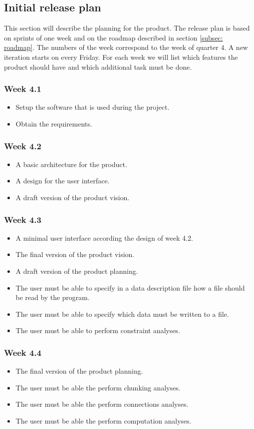 \subsection{Initial release plan}
\label{subsec: release-plan}
This section will describe the planning for the product. The release plan is based on sprints of one week and on the roadmap described in section \ref{subsec: roadmap}. The numbers of the week correspond to the week of quarter 4. A new iteration starts on every Friday. For each week we will list which features the product should have and which additional task must be done.
\subsubsection{Week 4.1}
\begin{itemize}
	\item Setup the software that is used during the project.
	\item Obtain the requirements.
\end{itemize}

\subsubsection{Week 4.2}
\begin{itemize}
\item A basic architecture for the product.
\item A design for the user interface.
\item A draft version of the product vision.
\end{itemize}
\subsubsection{Week 4.3}
\begin{itemize}
	\item A minimal user interface according the design of week 4.2.
	\item The final version of the product vision.
	\item A draft version of the product planning.
	\item The user must be able to specify in a data description file how a file should be read by the program.
	\item The user must be able to specify which data must be written to a file.
	\item The user must be able to perform constraint analyses.
\end{itemize}
\subsubsection{Week 4.4}
\begin{itemize}
	\item The final version of the product planning.
	\item The user must be able the perform chunking analyses.
	\item The user must be able the perform connections analyses.
	\item The user must be able the perform computation analyses.
\end{itemize}
